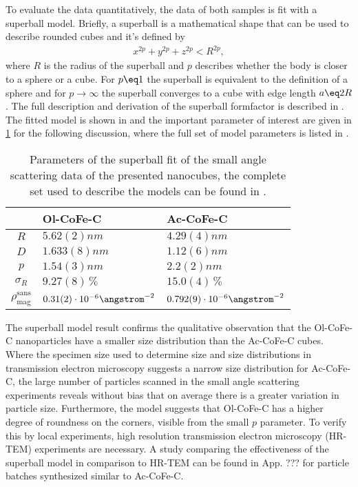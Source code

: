 \documentclass[\main/dresen_thesis.tex]{subfiles}
\begin{document}
    To evaluate the data quantitatively, the data of both samples is fit with a superball model.
    Briefly, a superball is a mathematical shape that can be used to describe rounded cubes and it's defined by
    \begin{align}
      x^{2p} + y^{2p} + z^{2p} < R^{2p},
    \end{align}
    where $R$ is the radius of the superball and $p$ describes whether the body is closer to a sphere or a cube.
    For $p\eq1$ the superball is equivalent to the definition of a sphere and for $p \rightarrow \infty$ the superball converges to a cube with edge length $a \eq 2R$.
    The full description and derivation of the superball formfactor is described in .
    The fitted model is shown in  and the important parameter of interest are given in \ref{tab:monolayers:nanoparticle:sas} for the following discussion, where the full set of model parameters is listed in .
    \begin{table}[ht]
      \centering
      \caption{\label{tab:monolayers:nanoparticle:sas}Parameters of the superball fit of the small angle scattering data of the presented nanocubes, the complete set used to describe the models can be found in .}
      \begin{tabular}{ c | l | l }
          & Ol-CoFe-C & Ac-CoFe-C \\
        \hline
        $R$
          & $5.62(2) \unit{nm}$
          & $4.29(4) \unit{nm}$\\
        $D$
          & $1.633(8) \unit{nm}$
          & $1.12(6) \unit{nm}$\\
        $p$
          & $1.54(3) \unit{nm}$
          & $2.2(2) \unit{nm}$\\
        $\sigma_R$
          & $9.27(8) \,\%$
          & $15.0(4) \,\%$\\
        $\rho_\mathrm{mag}^\mathrm{sans}$
          & $0.31(2) \cdot 10^{-6} \angstrom^{-2}$
          & $0.792(9) \cdot 10^{-6} \angstrom^{-2}$\\
        \hline
      \end{tabular}
    \end{table}
    The superball model result confirms the qualitative observation that the Ol-CoFe-C nanoparticles have a smaller size distribution than the Ac-CoFe-C cubes.
    Where the specimen size used to determine size and size distributions in transmission electron microscopy suggests a narrow size distribution for Ac-CoFe-C, the large number of particles scanned in the small angle scattering experiments reveals without bias that on average there is a greater variation in particle size.
    Furthermore, the model suggests that Ol-CoFe-C has a higher degree of roundness on the corners, visible from the small $p$ parameter.
    To verify this by local experiments, high resolution transmission electron microscopy (HR-TEM) experiments are necessary.
    A study comparing the effectiveness of the superball model in comparison to HR-TEM can be found in App. ??? for particle batches synthesized similar to Ac-CoFe-C.
\end{document}

